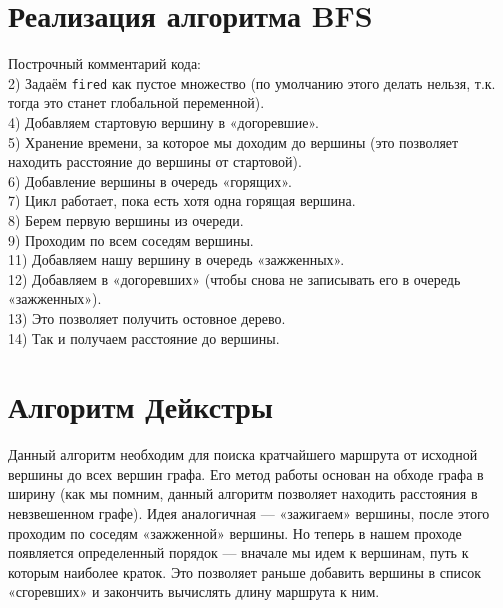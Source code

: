 \section{Реализация алгоритма BFS}
Построчный комментарий кода:\\
2) Задаём \texttt{fired} как пустое множество (по умолчанию этого делать нельзя, т.к. тогда это станет глобальной переменной).\\
4) Добавляем стартовую вершину в «догоревшие».\\
5) Хранение времени, за которое мы доходим до вершины (это позволяет находить расстояние до вершины от стартовой).\\
6) Добавление вершины в очередь «горящих».\\
7) Цикл работает, пока есть хотя одна горящая вершина.\\
8) Берем первую вершины из очереди.\\
9) Проходим по всем соседям вершины.\\
11) Добавляем нашу вершину в очередь «зажженных».\\
12) Добавляем в «догоревших» (чтобы снова не записывать его в очередь «зажженных»).\\
13) Это позволяет получить остовное дерево.\\
14) Так и получаем расстояние до вершины.\\


\section{Алгоритм Дейкстры}
Данный алгоритм необходим для поиска кратчайшего маршрута от исходной вершины до всех вершин графа. Его метод работы основан на обходе графа в ширину (как мы помним, данный алгоритм позволяет находить расстояния в невзвешенном графе). Идея аналогичная --- «зажигаем» вершины, после этого проходим по соседям «зажженной» вершины. Но теперь в нашем проходе появляется определенный порядок --- вначале мы идем к вершинам, путь к которым наиболее краток. Это позволяет раньше добавить вершины в список «сгоревших» и закончить вычислять длину маршрута к ним.

